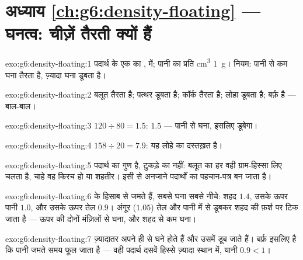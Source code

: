 \section*{अध्याय \ref{ch:g6:density-floating} --- घनत्व: चीज़ें तैरती क्यों हैं}

\begin{solution}{exo:g6:density-floating:1}
पदार्थ के एक  का ,  में; पानी का प्रति
\unit{cm^3} \qty{1}{g}। नियम: पानी से कम घना तैरता है, ज़्यादा घना
डूबता है।
\end{solution}

\begin{solution}{exo:g6:density-floating:2}
बलूत तैरता है; पत्थर डूबता है; कॉर्क तैरता है; लोहा डूबता है; बर्फ़
 है --- बाल-बाल।
\end{solution}

\begin{solution}{exo:g6:density-floating:3}
$120 \div 80 = 1.5$:  $1.5$ --- पानी से घना, इसलिए डूबेगा।
\end{solution}

\begin{solution}{exo:g6:density-floating:4}
$158 \div 20 = 7.9$: यह लोहे का दस्तख़त है।
\end{solution}

\begin{solution}{exo:g6:density-floating:5}
 पदार्थ का गुण है, टुकड़े का नहीं: बलूत का हर  वही
ग्राम-हिस्सा लिए चलता है, चाहे वह किरच हो या शहतीर। इसी से 
अनजाने पदार्थों का पहचान-पत्र बन जाता है।
\end{solution}

\begin{solution}{exo:g6:density-floating:6}
  के हिसाब से जमते हैं, सबसे घना सबसे नीचे: शहद $1.4$, उसके
ऊपर पानी $1.0$, और उसके ऊपर तेल $0.9$। अंगूर ($1.05$) तेल और पानी में
से डूबकर शहद की फ़र्श पर टिक जाता है --- ऊपर की दोनों मंज़िलों से घना,
और शहद से कम घना।
\end{solution}

\begin{solution}{exo:g6:density-floating:7}
ज़्यादातर  अपने ही  से घने होते हैं और उसमें डूब जाते हैं।
बर्फ़ इसलिए  है कि पानी जमते समय फूल जाता है --- वही पदार्थ दसवें
हिस्से ज़्यादा स्थान में, यानी  $0.9 < 1$।
\end{solution}

